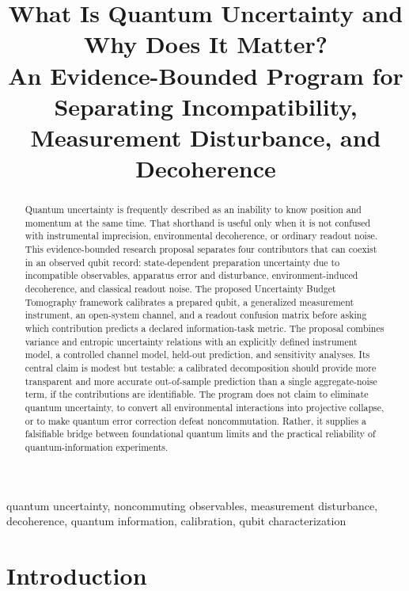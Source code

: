 \documentclass[conference]{../../../../Conference-LaTeX-template_10-17-19/IEEEtran}
\begin{document}
\title{What Is Quantum Uncertainty and Why Does It Matter?\\
\large An Evidence-Bounded Program for Separating Incompatibility, Measurement Disturbance, and Decoherence}

\author{}

\maketitle

\begin{abstract}
Quantum uncertainty is frequently described as an inability to know position and momentum at the same time. That shorthand is useful only when it is not confused with instrumental imprecision, environmental decoherence, or ordinary readout noise. This evidence-bounded research proposal separates four contributors that can coexist in an observed qubit record: state-dependent preparation uncertainty due to incompatible observables, apparatus error and disturbance, environment-induced decoherence, and classical readout noise. The proposed Uncertainty Budget Tomography framework calibrates a prepared qubit, a generalized measurement instrument, an open-system channel, and a readout confusion matrix before asking which contribution predicts a declared information-task metric. The proposal combines variance and entropic uncertainty relations with an explicitly defined instrument model, a controlled channel model, held-out prediction, and sensitivity analyses. Its central claim is modest but testable: a calibrated decomposition should provide more transparent and more accurate out-of-sample prediction than a single aggregate-noise term, if the contributions are identifiable. The program does not claim to eliminate quantum uncertainty, to convert all environmental interactions into projective collapse, or to make quantum error correction defeat noncommutation. Rather, it supplies a falsifiable bridge between foundational quantum limits and the practical reliability of quantum-information experiments.
\end{abstract}

\begin{IEEEkeywords}
quantum uncertainty, noncommuting observables, measurement disturbance, decoherence, quantum information, calibration, qubit characterization
\end{IEEEkeywords}

\section{Introduction}
\end{document}
